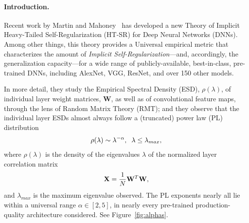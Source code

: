 \vspace{-3mm}
\paragraph{Introduction.}

Recent work by Martin and Mahoney~\cite{MM18_TR,MM19_HTSR_ICML} has developed a new Theory of Implicit Heavy-Tailed Self-Regularization (HT-SR) for Deep Neural Networks (DNNs). 
Among other things, this theory provides a Universal empirical metric that characterizes the amount of \emph{Implicit Self-Regularization}---and, accordingly, the generalization capacity---for a wide range of publicly-available, best-in-class, pre-trained DNNs, including AlexNet, VGG, ResNet, and over 150 other models.

In more detail, they study the Empirical Spectral Density (ESD), $\rho(\lambda)$, of individual layer weight matrices, $\mathbf{W}$, as well as of convolutional feature maps, through the lens of Random Matrix Theory (RMT); and they observe that the individual layer ESDs almost always follow a (truncated) power law (PL) distribution
\vspace{-2mm}
\begin{equation}
\rho(\lambda)\sim\lambda^{-\alpha},\;\;\lambda\le\lambda_{max},
\label{eqn:eigenval_pl}
\vspace{-1mm}
\end{equation}
where $\rho(\lambda)$ is the density of the eigenvalues $\lambda$ of the normalized layer correlation matrix 
\vspace{-2mm}
\begin{equation}
 \mathbf{X} = \frac{1}{N}\mathbf{W}^{T}\mathbf{W},
\vspace{-1mm}
\end{equation}
and $\lambda_{max}$ is the maximum eigenvalue observed.
The PL exponents nearly all lie within a universal range $\alpha\in[2,5]$, in nearly every pre-trained production-quality architecture considered.
See Figure~\ref{fig:alphas}.

\vspace{-2mm}

